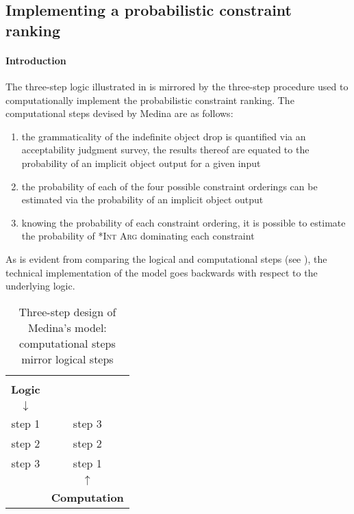 \subsection{Implementing a probabilistic constraint ranking} 

\paragraph{Introduction} The three-step logic illustrated in  is mirrored by the three-step procedure used to computationally implement the probabilistic constraint ranking. The computational steps devised by Medina are as follows: 

\begin{enumerate}
    \item the grammaticality of the indefinite object drop is quantified via an acceptability judgment survey, the results thereof are equated to the probability of an implicit object output for a given input
    \item the probability of each of the four possible constraint orderings can be estimated via the probability of an implicit object output
    \item knowing the probability of each constraint ordering, it is possible to estimate the probability of \textsc{*Int Arg} dominating each constraint
\end{enumerate}

As is evident from comparing the logical and computational steps (see ), the technical implementation of the model goes backwards with respect to the underlying logic.

\begin{table}[htb] %
\caption{Three-step design of Medina's model: computational steps mirror logical steps}
\begin{tabular}{c c}
 & \\
\cmidrule{1-1} %
\textbf{Logic} &                      \\
\textbf{$\downarrow$} &                      \\ \hline
step 1         & step 3               \\
step 2         & step 2               \\
step 3         & step 1               \\ \hline
               & \textbf{$\uparrow$} \\
               & \textbf{Computation} \\
\cmidrule{2-2}           
\end{tabular}
\end{table}

